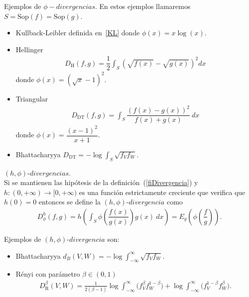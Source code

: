 \begin{example} Ejemplos de $\phi-divergencias$. En estos ejemplos llamaremos $S=\mathrm{Sop}(f)=\mathrm{Sop}(g).$
	\begin{itemize}
		\item Kullback-Leibler definida en~\ref{KL} donde $\phi(x)=x \log(x)$.
		\item Hellinger
		\begin{align} 
		D_{\text{H}}(f,g)=\dfrac{1}{2} \displaystyle \int_{S} \left(\sqrt{f(x)}-\sqrt{g(x)}\right)^2 dx
		\end{align}
		donde $\phi(x)=\left(\sqrt{x}-1\right)^2$.
		\item Triangular
		\begin{align}
		D_{\text{DT}}(f,g)=\displaystyle \int_{S} \dfrac{\left(f(x)-g(x)\right)^2}{f(x)+g(x)} \ dx
		\end{align}
		donde $\phi(x)=\dfrac{\left(x-1 \right)^2}{x+1}$.
		\item Bhattacharyya $D_{\text{DT}}=-\log \displaystyle \int_{S} \sqrt{f_Vf_W}$.
	\end{itemize}
\end{example}

\begin{definition} $\left(h,\phi\right) \text{-} divergencias$.\\
	\label{hfiDivergencia}
	Si se mantienen las hipótesis de la definición~(\ref{fiDivergencia}) y $h\colon (0,+\infty)\longrightarrow [0,+\infty)$ es una función estrictamente creciente que verifica que $h(0)=0$ entonces se define la $\left(h,\phi\right) \text{-} divergencia$ como
	\begin{align}
	D^h_{\phi}(f, g)=h\left(\int_{S} \phi\left(\dfrac{f(x)}{g(x)}\right) g(x) \ dx\right)=E_{g}\left(\phi\left(\dfrac{f}{g}\right)\right).
	\end{align}
\end{definition}
	
\begin{example} Ejemplos de $\left(h,\phi\right) \text{-} divergencia$ son:
	\begin{itemize}
		\item Bhattacharyya $d_B(V,W)=-\log\int_{-\infty}^{\infty}\sqrt{f_Vf_W}.$
		
		\item R\'enyi con parámetro $\beta\in(0,1)$ 
		\begin{align}
		D_\text{R}^{\beta}(V,W)=\frac{1}{2(\beta-1)}\log\int_{-\infty}^{\infty}\big({f_V^{\beta}f_W^{1-\beta})+\log\int_{-\infty}^{\infty}\big(f_V^{1-\beta}f_W^{\beta}}\big).
		\end{align}
	\end{itemize}
\end{example}
		
